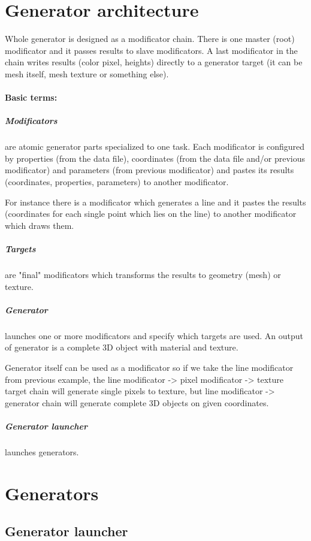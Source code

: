 \documentclass[11pt]{article}
\begin{document}
\section{Generator architecture}

Whole generator is designed as a modificator chain. There is one master (root)
modificator and it passes results to slave modificators. A last modificator 
in the chain writes results (color pixel, heights) directly to a generator target
(it can be mesh itself, mesh texture or something else).

\paragraph{Basic terms:}
\subparagraph{Modificators}
are atomic generator parts specialized to one task. Each modificator 
is configured by properties (from the data file), coordinates (from the data 
file and/or previous modificator) and parameters (from previous modificator) and
pastes its results (coordinates, properties, parameters) to another modificator. 

For instance there is a modificator which generates a line and it 
pastes the results (coordinates for each single point which lies on the line) 
to another modificator which draws them.

\subparagraph{Targets}
are "final" modificators which transforms the results to geometry (mesh) or texture. 

\subparagraph{Generator}
launches one or more modificators and specify which targets are used.  
An output of generator is a complete 3D object with material and texture. 

Generator itself can be used as a modificator so
if we take the line modificator from previous example, 
the line modificator -> pixel modificator -> texture target chain will 
generate single pixels to texture, but line modificator -> generator 
chain will generate complete 3D objects on given coordinates.

\subparagraph{Generator launcher}
launches generators.

\section{Generators}

\subsection{Generator launcher}
\end{document}
